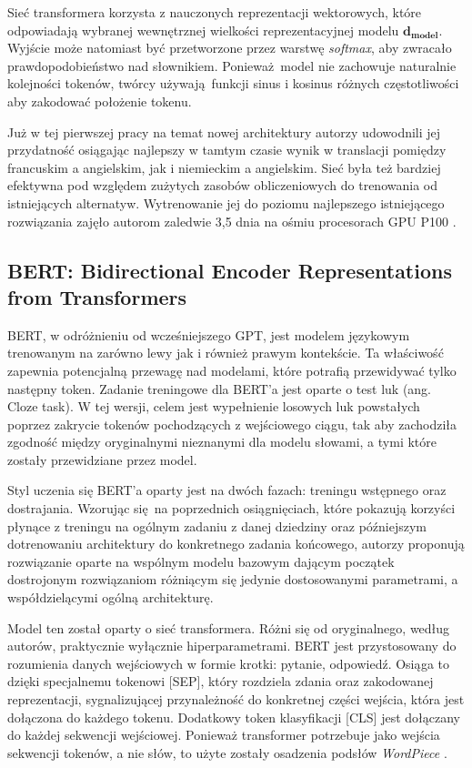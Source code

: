 Sieć transformera korzysta z nauczonych reprezentacji wektorowych, które odpowiadają wybranej wewnętrznej wielkości reprezentacyjnej modelu $\mathbf{d_{model}}$. Wyjście może natomiast być przetworzone przez warstwę \emph{softmax}, aby zwracało prawdopodobieństwo nad słownikiem. Ponieważ model nie zachowuje naturalnie kolejności tokenów, twórcy używają funkcji sinus i kosinus różnych częstotliwości aby zakodować położenie tokenu.\newline

Już w tej pierwszej pracy na temat nowej architektury autorzy udowodnili jej przydatność osiągając najlepszy w tamtym czasie wynik w translacji pomiędzy francuskim a angielskim, jak i niemieckim a angielskim. Sieć była też bardziej efektywna pod względem zużytych zasobów obliczeniowych do trenowania od istniejących alternatyw. Wytrenowanie jej do poziomu najlepszego istniejącego rozwiązania zajęło autorom zaledwie 3,5 dnia na ośmiu procesorach GPU P100 \autocite{vaswani2017attention}. 

\subsection{BERT: Bidirectional Encoder Representations  from Transformers}

BERT, w odróżnieniu od wcześniejszego GPT, jest modelem językowym trenowanym na zarówno lewy jak i również prawym kontekście. Ta właściwość zapewnia potencjalną przewagę nad modelami, które potrafią przewidywać tylko następny token. Zadanie treningowe dla BERT'a jest oparte o test luk (ang. Cloze task). W tej wersji, celem jest wypełnienie losowych luk powstałych poprzez zakrycie tokenów pochodzących z wejściowego ciągu, tak aby zachodziła zgodność między oryginalnymi nieznanymi dla modelu słowami, a tymi które zostały przewidziane przez model.\newline

Styl uczenia się BERT'a oparty jest na dwóch fazach: treningu wstępnego oraz dostrajania. Wzorując się na poprzednich osiągnięciach, które pokazują korzyści płynące z treningu na ogólnym zadaniu z danej dziedziny oraz późniejszym dotrenowaniu architektury do konkretnego zadania końcowego, autorzy proponują rozwiązanie oparte na wspólnym modelu bazowym dającym początek dostrojonym rozwiązaniom różniącym się jedynie dostosowanymi parametrami, a współdzielącymi ogólną architekturę.\newline

Model ten został oparty o sieć transformera. Różni się od oryginalnego, według autorów, praktycznie wyłącznie hiperparametrami. BERT jest przystosowany do rozumienia danych wejściowych w formie krotki: pytanie, odpowiedź. Osiąga to dzięki specjalnemu tokenowi [SEP], który rozdziela zdania oraz zakodowanej reprezentacji, sygnalizującej przynależność do konkretnej części wejścia, która jest dołączona do każdego tokenu. Dodatkowy token klasyfikacji [CLS] jest dołączany do każdej sekwencji wejściowej. Ponieważ transformer potrzebuje jako wejścia sekwencji tokenów, a nie słów, to użyte zostały osadzenia podsłów \emph{WordPiece} \autocite{devlin2018bert}.\newline

